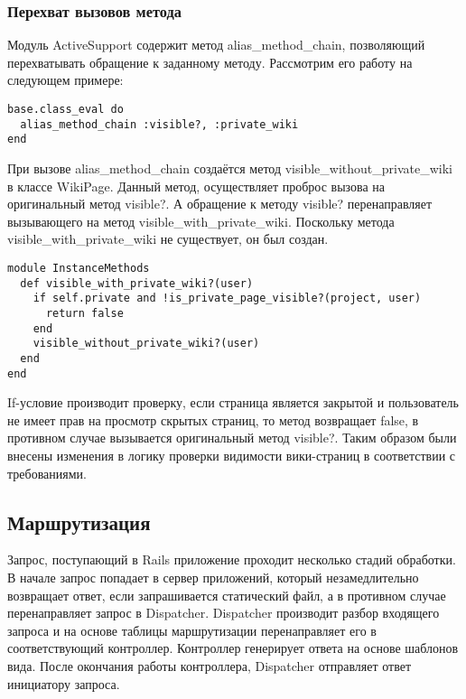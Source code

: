\subsubsection{Перехват вызовов метода}
Модуль ActiveSupport содержит метод alias\_method\_chain, позволяющий
перехватывать обращение к заданному методу. Рассмотрим его работу на следующем
примере:
\small{
\begin{lstlisting}
base.class_eval do
  alias_method_chain :visible?, :private_wiki
end
\end{lstlisting}}
При вызове alias\_method\_chain создаётся метод
visible\_without\_private\_wiki в классе WikiPage. Данный метод, осуществляет
проброс вызова на оригинальный метод visible?. А обращение к методу visible?
перенаправляет вызывающего на метод visible\_with\_private\_wiki. Поскольку
метода visible\_with\_private\_wiki не существует, он был создан.
\small{
\begin{lstlisting}
module InstanceMethods
  def visible_with_private_wiki?(user)  
    if self.private and !is_private_page_visible?(project, user)
      return false
    end
    visible_without_private_wiki?(user)
  end
end
\end{lstlisting}}
If-условие производит проверку, если страница является закрытой и пользователь
не имеет прав на просмотр скрытых страниц, то метод возвращает false, в
противном случае вызывается оригинальный метод visible?. Таким образом были
внесены изменения в логику проверки видимости вики-страниц в соответствии с
требованиями.

\subsection{Маршрутизация}
Запрос, поступающий в Rails приложение проходит несколько стадий
обработки. В начале запрос попадает в сервер приложений, который
незамедлительно возвращает ответ, если запрашивается статический файл, а в
противном случае перенаправляет запрос в Dispatcher. Dispatcher производит
разбор входящего запроса и на основе таблицы маршрутизации перенаправляет его в
соответствующий контроллер. Контроллер генерирует ответа на основе
шаблонов вида. После окончания работы контроллера, Dispatcher отправляет ответ
инициатору запроса.

